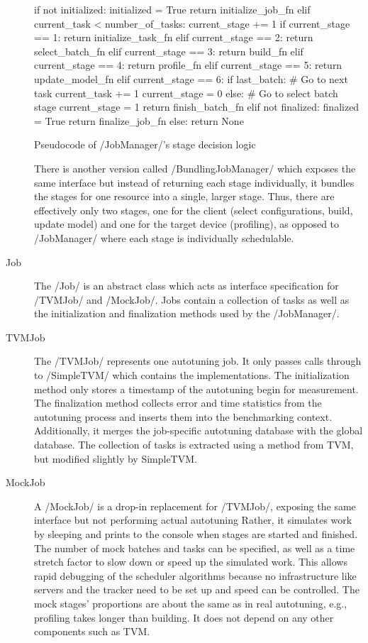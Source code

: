 \begin{description}
\begin{listing}[h]
\begin{pythoncode}
if not initialized:
    initialized = True
    return initialize_job_fn
elif current_task < number_of_tasks:
    current_stage += 1
    if   current_stage == 1: return initialize_task_fn
    elif current_stage == 2: return select_batch_fn
    elif current_stage == 3: return build_fn
    elif current_stage == 4: return profile_fn
    elif current_stage == 5: return update_model_fn
    elif current_stage == 6:
        if last_batch:
            # Go to next task
            current_task += 1
            current_stage = 0
        else:
            # Go to select batch stage
            current_stage = 1
        return finish_batch_fn
elif not finalized:
    finalized = True
    return finalize_job_fn
else: return None
\end{pythoncode}
\unskip
\caption[{Pseudocode of JobManager's stage decision logic}]{Pseudocode of \pythoninline/JobManager/'s stage decision logic}
\label{lst:stage-decision-algo}
\end{listing}
	There is another version called \pythoninline/BundlingJobManager/ which exposes the same interface but instead of returning each stage individually, it bundles the stages for one resource into a single, larger stage. Thus, there are effectively only two stages, one for the client (select configurations, build, update model) and one for the target device (profiling), as opposed to \pythoninline/JobManager/ where each stage is individually schedulable.
	\item[Job] The \pythoninline/Job/ is an abstract class which acts as interface specification for \pythoninline/TVMJob/ and \pythoninline/MockJob/. Jobs contain a collection of tasks as well as the initialization and finalization methods used by the \pythoninline/JobManager/.
	\item[TVMJob] The \pythoninline/TVMJob/ represents one autotuning job. It only passes calls through to \pythoninline/SimpleTVM/ which contains the implementations. The initialization method only stores a timestamp of the autotuning begin for measurement. The finalization method collects error and time statistics from the autotuning process and inserts them into the benchmarking context. Additionally, it merges the job-specific autotuning database with the global database. The collection of tasks is extracted using a method from TVM, but modified slightly by SimpleTVM.
	\item[MockJob] A \pythoninline/MockJob/ is a drop-in replacement for \pythoninline/TVMJob/, exposing the same interface but not performing actual autotuning Rather, it simulates work by sleeping and prints to the console when stages are started and finished. The number of mock batches and tasks can be specified, as well as a time stretch factor to slow down or speed up the simulated work. This allows rapid debugging of the scheduler algorithms because no infrastructure like servers and the tracker need to be set up and speed can be controlled. The mock stages' proportions are about the same as in real autotuning, e.g., profiling takes longer than building. It does not depend on any other components such as TVM.
\end{description}

